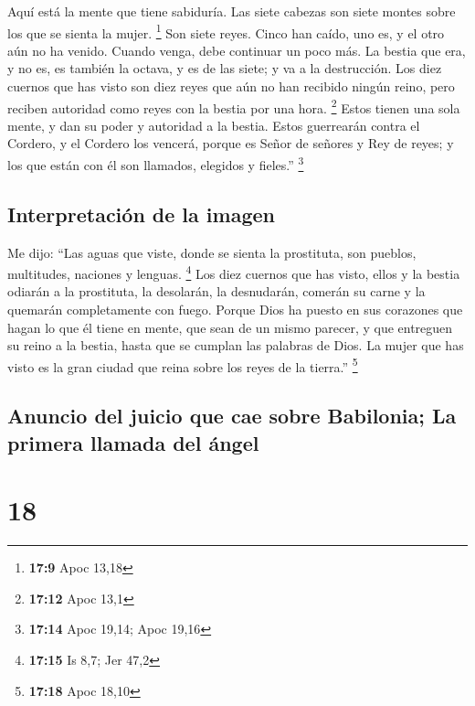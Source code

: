  Aquí está la mente que tiene sabiduría. Las siete cabezas
son siete montes sobre los que se sienta la mujer. \footnote{\textbf{17:9}
  Apoc 13,18}  Son siete reyes. Cinco han caído, uno es,
y el otro aún no ha venido. Cuando venga, debe continuar un poco más.
 La bestia que era, y no es, es también la octava, y es
de las siete; y va a la destrucción.  Los diez cuernos
que has visto son diez reyes que aún no han recibido ningún reino, pero
reciben autoridad como reyes con la bestia por una hora. \footnote{\textbf{17:12}
  Apoc 13,1}  Estos tienen una sola mente, y dan su poder
y autoridad a la bestia.  Estos guerrearán contra el
Cordero, y el Cordero los vencerá, porque es Señor de señores y Rey de
reyes; y los que están con él son llamados, elegidos y fieles.''
\footnote{\textbf{17:14} Apoc 19,14; Apoc 19,16}

\hypertarget{interpretaciuxf3n-de-la-imagen}{%
\subsection{Interpretación de la
imagen}\label{interpretaciuxf3n-de-la-imagen}}

 Me dijo: ``Las aguas que viste, donde se sienta la
prostituta, son pueblos, multitudes, naciones y lenguas. \footnote{\textbf{17:15}
  Is 8,7; Jer 47,2}  Los diez cuernos que has visto,
ellos y la bestia odiarán a la prostituta, la desolarán, la desnudarán,
comerán su carne y la quemarán completamente con fuego. 
Porque Dios ha puesto en sus corazones que hagan lo que él tiene en
mente, que sean de un mismo parecer, y que entreguen su reino a la
bestia, hasta que se cumplan las palabras de Dios.  La
mujer que has visto es la gran ciudad que reina sobre los reyes de la
tierra.'' \footnote{\textbf{17:18} Apoc 18,10}

\hypertarget{anuncio-del-juicio-que-cae-sobre-babilonia-la-primera-llamada-del-uxe1ngel}{%
\subsection{Anuncio del juicio que cae sobre Babilonia; La primera
llamada del
ángel}\label{anuncio-del-juicio-que-cae-sobre-babilonia-la-primera-llamada-del-uxe1ngel}}

\hypertarget{section-17}{%
\section{18}\label{section-17}}

